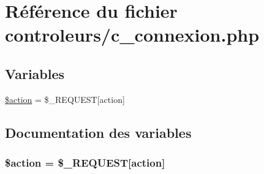 \hypertarget{c__connexion_8php}{}\section{Référence du fichier controleurs/c\+\_\+connexion.php}
\label{c__connexion_8php}
\subsection*{Variables}
\begin{DoxyCompactItemize}
\item 
\hyperlink{c__connexion_8php_aa698a3e72116e8e778be0e95d908ee30}{\$action} = \$\+\_\+\+R\+E\+Q\+U\+E\+S\+T\mbox{[}\textquotesingle{}action\textquotesingle{}\mbox{]}
\end{DoxyCompactItemize}


\subsection{Documentation des variables}
\hypertarget{c__connexion_8php_aa698a3e72116e8e778be0e95d908ee30}{}
\subsubsection[{\$action}]{\setlength{\rightskip}{0pt plus 5cm}\$action = \$\+\_\+\+R\+E\+Q\+U\+E\+S\+T\mbox{[}\textquotesingle{}action\textquotesingle{}\mbox{]}}\label{c__connexion_8php_aa698a3e72116e8e778be0e95d908ee30}
